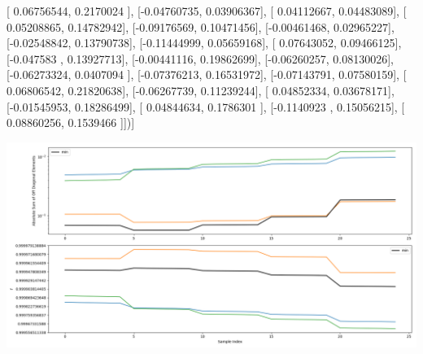 \documentclass{article}
\begin{document}
       [ 0.06756544,  0.2170024 ],
       [-0.04760735,  0.03906367],
       [ 0.04112667,  0.04483089],
       [ 0.05208865,  0.14782942],
       [-0.09176569,  0.10471456],
       [-0.00461468,  0.02965227],
       [-0.02548842,  0.13790738],
       [-0.11444999,  0.05659168],
       [ 0.07643052,  0.09466125],
       [-0.047583  ,  0.13927713],
       [-0.00441116,  0.19862699],
       [-0.06260257,  0.08130026],
       [-0.06273324,  0.0407094 ],
       [-0.07376213,  0.16531972],
       [-0.07143791,  0.07580159],
       [ 0.06806542,  0.21820638],
       [-0.06267739,  0.11239244],
       [ 0.04852334,  0.03678171],
       [-0.01545953,  0.18286499],
       [ 0.04844634,  0.1786301 ],
       [-0.1140923 ,  0.15056215],
       [ 0.08860256,  0.1539466 ]])]
\begin{center}
\includegraphics[scale=.9]{report_pickled_controls207/control_dpn_all.png}

\end{center}
\end{document}
